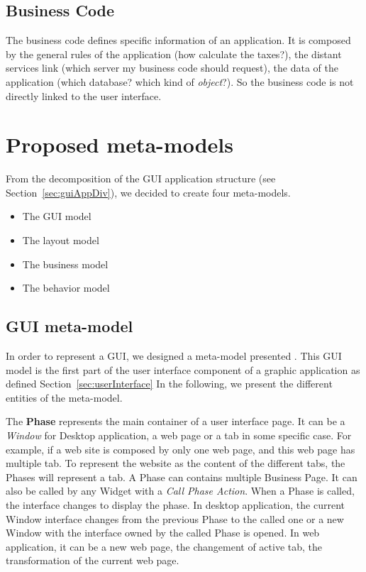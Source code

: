 \documentclass[conference]{IEEEtran}
\begin{document}
\subsection{Business Code}
\label{sec:businessCode}

The business code defines specific information of an application.
It is composed by the general rules of the application
    (how calculate the taxes?),
    the distant services link (which server my business code should request),
    the data of the application (which database? which kind of \textit{object}?).
So the business code is not directly linked to the user interface. 

\section{Proposed meta-models}
\label{sec:contribution}

From the decomposition of the GUI application structure (see Section~\ref{sec:guiAppDiv}),
    we decided to create four meta-models.

\begin{itemize}
    \item The GUI model
    \item The layout model
    \item The business model
    \item The behavior model
\end{itemize}


\subsection{GUI meta-model}
\label{sec:guiModel}

In order to represent a GUI, we designed a meta-model presented .
This GUI model is the first part of the user interface component of
    a graphic application as defined Section~\ref{sec:userInterface}
In the following, we present the different entities of the meta-model.



The \textbf{Phase} represents the main container of a user interface page.
It can be a \textit{Window} for Desktop application,
    a web page or a tab in some specific case.
For example, 
    if a web site is composed by only one web page, 
    and this web page has multiple tab.
To represent the website as the content of the different tabs, 
    the Phases will represent a tab.
A Phase can contains multiple Business Page.
It can also be called by any Widget with a \textit{Call Phase Action}.
When a Phase is called, the interface changes to display the phase.
In desktop application, the current Window interface changes from the previous Phase to 
    the called one or a new Window with the interface owned by the called Phase is opened.
In web application, it can be a new web page, the changement of active tab, the transformation of the current web page. 
\end{document}
